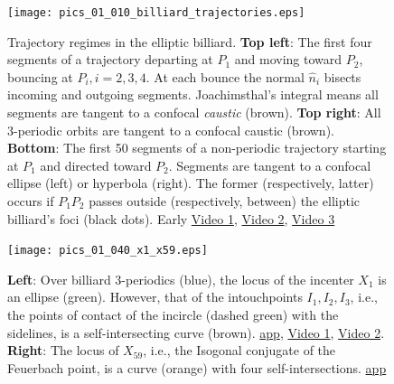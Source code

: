 \begin{figure}
    \centering
    \texttt{[image: pics\_01\_010\_billiard\_trajectories.eps]}
    \caption{Trajectory regimes in the elliptic billiard. \textbf{Top left}: The first four segments of a trajectory departing at $P_1$ and moving toward $P_2$, bouncing at $P_i, i=2,3,4$. At each bounce the normal $\hat{n}_i$ bisects incoming and outgoing segments. Joachimsthal's integral \cite{sergei91} means all segments are tangent to a confocal {\em caustic} (brown). \textbf{Top right}: All 3-periodic orbits are tangent to a confocal caustic (brown). \textbf{Bottom}: The first 50 segments of a non-periodic trajectory starting at $P_1$ and directed toward $P_2$. Segments are tangent to a confocal ellipse (left) or hyperbola (right). The former (respectively, latter) occurs if $P_1P_2$ passes outside (respectively, between) the elliptic billiard's foci (black dots). Early \href{https://youtu.be/A7mPzrNJHkA}{Video 1}, \href{https://youtu.be/9zAr5-nm7mw}{Video 2}, \href{https://youtu.be/6yXA0dyWhFY}{Video 3}}
    \label{fig:01-billiard-trajectories}
\end{figure}


\begin{figure}
    \centering
    \texttt{[image: pics\_01\_040\_x1\_x59.eps]}
    \caption{\textbf{Left}: Over billiard 3-periodics (blue), the locus of the incenter $X_1$ is an ellipse (green). However, that of the intouchpoints $I_1,I_2,I_3$, i.e., the points of contact of the incircle (dashed green) with the sidelines, is a self-intersecting curve (brown). \href{https://bit.ly/3q4b0Nn}{app},  \href{https://youtu.be/BBsyM7RnswA}{Video 1}, \href{https://youtu.be/9xU6T7hQMzs}{Video 2}. \textbf{Right}: The locus of $X_{59}$, i.e., the Isogonal conjugate of the Feuerbach point, is a curve (orange) with four self-intersections.
    \href{https://bit.ly/3i4h6dX}{app}}
    \label{fig:01-intouch-x59}
\end{figure}
 
 
